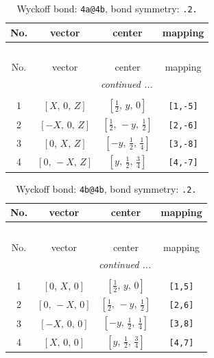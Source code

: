 \documentclass[fleqn,8pt]{jsarticle}
\begin{document}
\begin{longtable}{cccc}
\caption{Wyckoff bond: {\tt 4a@4b}, bond symmetry: {\tt .2.}}
 \\
 \hline \hline
No. & vector & center & mapping \\ \hline \endfirsthead

\multicolumn{3}{l}{\tablename\ \thetable{}} \\
 \hline \hline
No. & vector & center & mapping \\ \hline \endhead

 \hline \hline
\multicolumn{3}{r}{\footnotesize\it continued ...} \\ \endfoot

 \hline \hline
\multicolumn{3}{r}{} \\ \endlastfoot

1 & $\left[ X,\, 0,\, Z \right]$ & $\left[ \frac{1}{2},\, y,\, 0 \right]$ & {\tt [1,-5]} \\ \hline
2 & $\left[ - X,\, 0,\, Z \right]$ & $\left[ \frac{1}{2},\, - y,\, \frac{1}{2} \right]$ & {\tt [2,-6]} \\ \hline
3 & $\left[ 0,\, X,\, Z \right]$ & $\left[ - y,\, \frac{1}{2},\, \frac{1}{4} \right]$ & {\tt [3,-8]} \\ \hline
4 & $\left[ 0,\, - X,\, Z \right]$ & $\left[ y,\, \frac{1}{2},\, \frac{3}{4} \right]$ & {\tt [4,-7]} \\
\end{longtable}
\renewcommand{\arraystretch}{1.2}
\begin{longtable}{cccc}
\caption{Wyckoff bond: {\tt 4b@4b}, bond symmetry: {\tt .2.}}
 \\
 \hline \hline
No. & vector & center & mapping \\ \hline \endfirsthead

\multicolumn{3}{l}{\tablename\ \thetable{}} \\
 \hline \hline
No. & vector & center & mapping \\ \hline \endhead

 \hline \hline
\multicolumn{3}{r}{\footnotesize\it continued ...} \\ \endfoot

 \hline \hline
\multicolumn{3}{r}{} \\ \endlastfoot

1 & $\left[ 0,\, X,\, 0 \right]$ & $\left[ \frac{1}{2},\, y,\, 0 \right]$ & {\tt [1,5]} \\ \hline
2 & $\left[ 0,\, - X,\, 0 \right]$ & $\left[ \frac{1}{2},\, - y,\, \frac{1}{2} \right]$ & {\tt [2,6]} \\ \hline
3 & $\left[ - X,\, 0,\, 0 \right]$ & $\left[ - y,\, \frac{1}{2},\, \frac{1}{4} \right]$ & {\tt [3,8]} \\ \hline
4 & $\left[ X,\, 0,\, 0 \right]$ & $\left[ y,\, \frac{1}{2},\, \frac{3}{4} \right]$ & {\tt [4,7]} \\
\end{longtable}
\end{document}
